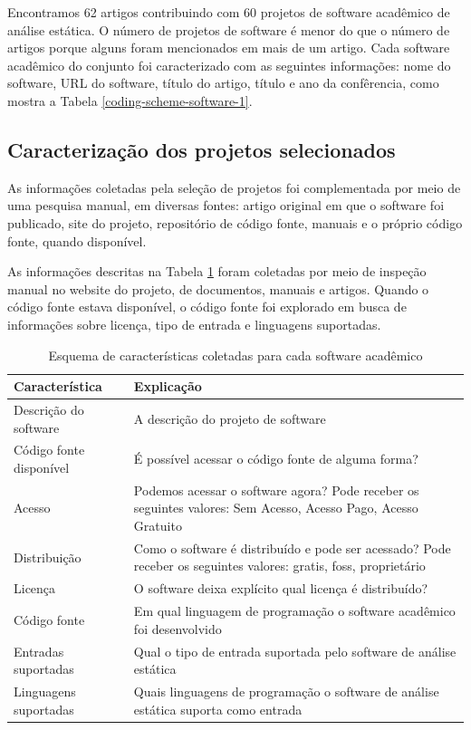 Encontramos 62 artigos contribuindo com 60 projetos de software acadêmico de
análise estática. O número de projetos de software é menor do que o número
de artigos porque alguns foram mencionados em mais de um artigo. 
Cada software acadêmico do conjunto foi caracterizado com
as seguintes informações: nome do software, URL do software, título do
artigo, título e ano da confêrencia, como mostra a  Tabela \ref{coding-scheme-software-1}.

\subsection{Caracterização dos projetos selecionados}

As informações coletadas pela seleção de projetos foi complementada por meio de
uma pesquisa manual, em diversas fontes: 
artigo original em que o software foi publicado, site do projeto,
repositório de código fonte, manuais e o próprio código fonte, quando disponível.

As informações descritas na Tabela \ref{coding-scheme-software} foram coletadas 
por meio de inspeção manual no website do projeto, de documentos, manuais e artigos.
Quando o código fonte estava disponível, o código fonte foi explorado em busca de 
informações sobre licença, tipo de entrada e linguagens suportadas.

\begin{table}[h]
\caption{Esquema de características coletadas para cada software acadêmico}
\centering
\begin{tabular}{ l p{11cm} }
  \hline
  Característica           & Explicação \\
  \hline
  Descrição do software    & A descrição do projeto de software \\
  Código fonte disponível  & É possível acessar o código fonte de alguma forma? \\
  Acesso                   & Podemos acessar o software agora? Pode receber os seguintes valores: Sem Acesso, Acesso Pago, Acesso Gratuito \\
  Distribuição             & Como o software é distribuído e pode ser acessado? Pode receber os seguintes valores: gratis, foss, proprietário \\
  Licença                  & O software deixa explícito qual licença é distribuído? \\
  Código fonte             & Em qual linguagem de programação o software acadêmico foi desenvolvido \\
  Entradas suportadas      & Qual o tipo de entrada suportada pelo software de análise estática \\
  Linguagens suportadas    & Quais linguagens de programação o software de análise estática suporta como entrada \\
  \hline
\end{tabular}
\label{coding-scheme-software}
\end{table}

